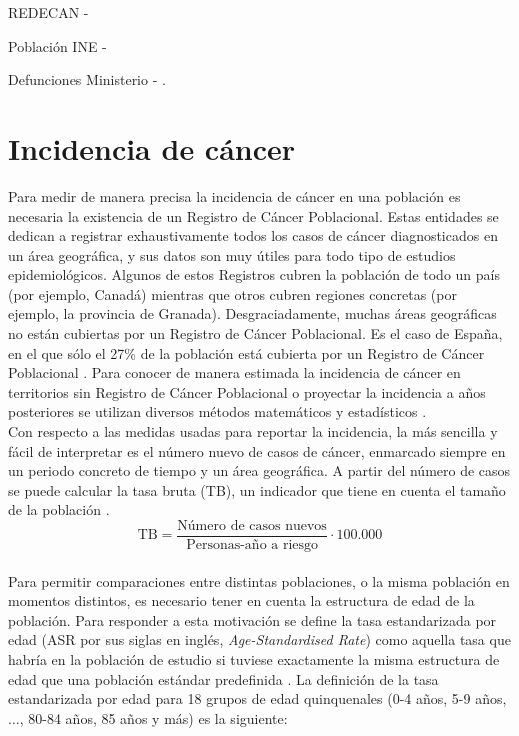 REDECAN - \cite{REDECAN2020}

Población INE - \cite{INEpob}

Defunciones Ministerio - \cite{MSCBS}.

\section{Incidencia de cáncer}

Para medir de manera precisa la incidencia de cáncer en una población es necesaria la existencia de un Registro de Cáncer Poblacional. Estas entidades se dedican a registrar exhaustivamente todos los casos de cáncer diagnosticados en un área geográfica, y sus datos son muy útiles para todo tipo de estudios epidemiológicos. Algunos de estos Registros cubren la población de todo un país (por ejemplo, Canadá) mientras que otros cubren regiones concretas (por ejemplo, la provincia de Granada). Desgraciadamente, muchas áreas geográficas no están cubiertas por un Registro de Cáncer Poblacional. Es el caso de España, en el que sólo el 27\% de la población está cubierta por un Registro de Cáncer Poblacional \cite{Redondo-Sanchez2019}. Para conocer de manera estimada la incidencia de cáncer en territorios sin Registro de Cáncer Poblacional o proyectar la incidencia a años posteriores se utilizan diversos métodos matemáticos y estadísticos \cite{Bray2018, GCO, ECIS, ECIS2, REDECAN2020, Redondo-Sanchez2019}.\\

Con respecto a las medidas usadas para reportar la incidencia, la más sencilla y fácil de interpretar es el número nuevo de casos de cáncer, enmarcado siempre en un periodo concreto de tiempo y un área geográfica. A partir del número de casos se puede calcular la tasa bruta (TB), un indicador que tiene en cuenta el tamaño de la población \cite{IARC1995}.\\

$$\text{TB}  = \dfrac{\text{Número de casos nuevos}}{\text{Personas-año a riesgo}} \cdot 100.000 $$\\

Para permitir comparaciones entre distintas poblaciones, o la misma población en momentos distintos, es necesario tener en cuenta la estructura de edad de la población. Para responder a esta motivación se define la tasa estandarizada por edad (ASR por sus siglas en inglés, \textit{Age-Standardised Rate}) como aquella tasa que habría en la población de estudio si tuviese exactamente la misma estructura de edad que una población estándar predefinida \cite{IARC1995}. La definición de la tasa estandarizada por edad para 18 grupos de edad quinquenales (0-4 años, 5-9 años, $\dots$, 80-84 años, 85 años y más) es la siguiente:

